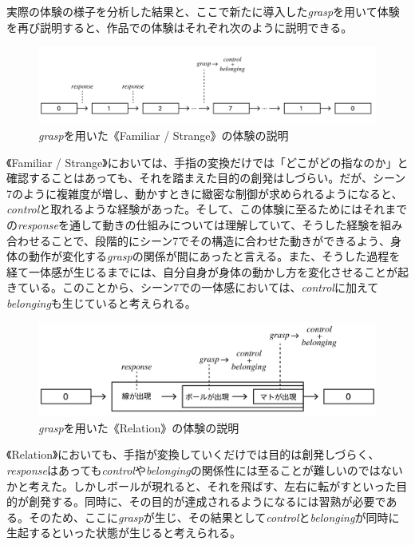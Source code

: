 実際の体験の様子を分析した結果と、ここで新たに導入した\textit{grasp}を用いて体験を再び説明すると、作品での体験はそれぞれ次のように説明できる。

\begin{figure}[H]
  \centering
  \includegraphics[width=15cm]{img/result_fs.png}
  \caption{\textit{grasp}を用いた《Familiar / Strange》の体験の説明}
  \label{fig:result_fs}
\end{figure}

《Familiar / Strange》においては、手指の変換だけでは「どこがどの指なのか」と確認することはあっても、それを踏まえた目的の創発はしづらい。だが、シーン7のように複雑度が増し、動かすときに緻密な制御が求められるようになると、\textit{control}と取れるような経験があった。そして、この体験に至るためにはそれまでの\textit{response}を通して動きの仕組みについては理解していて、そうした経験を組み合わせることで、段階的にシーン7でその構造に合わせた動きができるよう、身体の動作が変化する\textit{grasp}の関係が間にあったと言える。また、そうした過程を経て一体感が生じるまでには、自分自身が身体の動かし方を変化させることが起きている。このことから、シーン7での一体感においては、\textit{control}に加えて\textit{belonging}も生じていると考えられる。

\begin{figure}[H]
  \centering
  \includegraphics[width=15cm]{img/result_rl.png}
  \caption{\textit{grasp}を用いた《Relation》の体験の説明}
  \label{fig:result_rl}
\end{figure}

《Relation》においても、手指が変換していくだけでは目的は創発しづらく、\textit{response}はあっても\textit{control}や\textit{belonging}の関係性には至ることが難しいのではないかと考えた。しかしボールが現れると、それを飛ばす、左右に転がすといった目的が創発する。同時に、その目的が達成されるようになるには習熟が必要である。そのため、ここに\textit{grasp}が生じ、その結果として\textit{control}と\textit{belonging}が同時に生起するといった状態が生じると考えられる。


